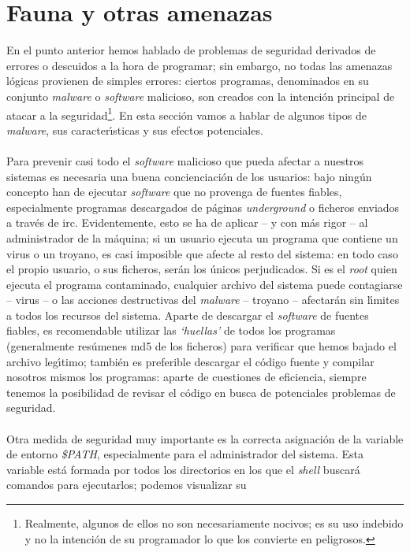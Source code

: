 \section{Fauna y otras amenazas}
En el punto anterior hemos hablado de problemas de seguridad derivados de 
errores o descuidos a la hora de programar; sin embargo, no todas las amenazas
l\'ogicas provienen de simples errores: ciertos programas, denominados en su
conjunto {\it malware} o {\it software} malicioso, son creados con la 
intenci\'on principal de atacar a la seguridad\footnote{Realmente, algunos de
ellos no son necesariamente nocivos; es su uso indebido y no la intenci\'on de
su programador lo que los convierte en peligrosos.}. En esta secci\'on vamos a 
hablar de algunos tipos de {\it malware}, sus caracter\'{\i}sticas y sus 
efectos potenciales.\\
\\Para prevenir casi todo el {\it software} malicioso que pueda afectar a 
nuestros sistemas es necesaria una buena concienciaci\'on de los usuarios: bajo
ning\'un concepto han de ejecutar {\it software} que no provenga de fuentes
fiables, especialmente programas descargados de p\'aginas {\it underground} o
ficheros enviados a trav\'es de {\sc irc}. Evidentemente, esto se ha de aplicar
-- y con m\'as rigor -- al administrador de la m\'aquina; si un usuario 
ejecuta un programa que contiene un virus o un troyano, es casi imposible que
afecte al resto del sistema: en todo caso el propio usuario, o sus ficheros,
ser\'an los \'unicos perjudicados. Si es el {\it root} quien ejecuta el programa
contaminado, cualquier archivo del sistema puede contagiarse -- virus -- o las
acciones destructivas del {\it malware} -- troyano -- afectar\'an sin 
l\'{\i}mites a todos los recursos del sistema. Aparte de descargar el {\it
software} de fuentes fiables, es recomendable utilizar las {\it `huellas'} de
todos los programas (generalmente res\'umenes {\sc md5} de los ficheros) para
verificar que hemos bajado el archivo leg\'{\i}timo; tambi\'en es preferible
descargar el c\'odigo fuente y compilar nosotros mismos los programas: aparte 
de cuestiones de eficiencia, siempre tenemos la posibilidad de revisar el
c\'odigo en busca de potenciales problemas de seguridad.\\
\\Otra medida de seguridad muy importante es la correcta asignaci\'on de la
variable de entorno {\it \$PATH}, especialmente para el administrador del
sistema. Esta variable est\'a formada por todos los directorios en los que
el {\it shell} buscar\'a comandos para ejecutarlos; podemos visualizar su
